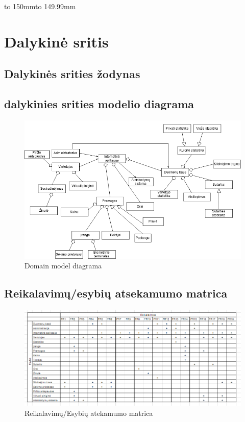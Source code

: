 \documentclass[oneside]{VUMIFPSkursinis}
\begin{document}
\hbox to 150mm{\hbox to 149.99mm{}}

\section{Dalykinė sritis}
\subsection{Dalykinės srities žodynas}
\subsection{dalykinies srities modelio diagrama}
\begin{figure}[h]
    \centering
    \includegraphics[width=1\textwidth]{DomainModel.png}
    \caption{Domain model diagrama}
    \label{fig:DomainModel}
\end{figure}
\subsection{Reikalavimų/esybių atsekamumo matrica}	
\begin{figure}[h]
    \centering
    \includegraphics[width=1\textwidth]{Reikalavimai_Esybes.png}
    \caption{Reikalavimų/Esybių atekamumo matrica}
    \label{fig:r/e_matrica}
\end{figure}
\end{document}
